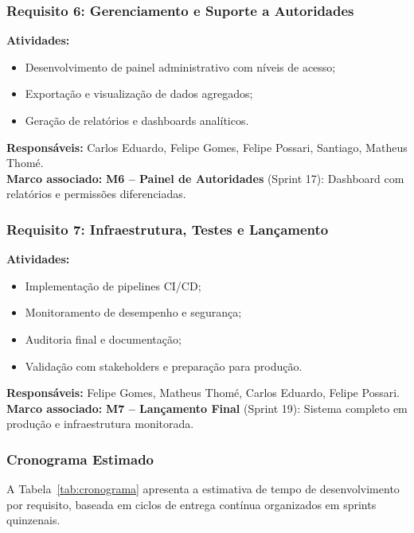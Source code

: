 \documentclass[a5paper, 12pt]{article}
\begin{document}
\subsubsection*{Requisito 6: Gerenciamento e Suporte a Autoridades}
\textbf{Atividades:}
\begin{itemize}
  \item Desenvolvimento de painel administrativo com níveis de acesso;
  \item Exportação e visualização de dados agregados;
  \item Geração de relatórios e dashboards analíticos.
\end{itemize}
\textbf{Responsáveis:} Carlos Eduardo, Felipe Gomes, Felipe Possari, Santiago, Matheus Thomé. \\
\textbf{Marco associado:} \textbf{M6 – Painel de Autoridades} (Sprint 17): Dashboard com relatórios e permissões diferenciadas.

\subsubsection*{Requisito 7: Infraestrutura, Testes e Lançamento}
\textbf{Atividades:}
\begin{itemize}
  \item Implementação de pipelines CI/CD;
  \item Monitoramento de desempenho e segurança;
  \item Auditoria final e documentação;
  \item Validação com stakeholders e preparação para produção.
\end{itemize}
\textbf{Responsáveis:} Felipe Gomes, Matheus Thomé, Carlos Eduardo, Felipe Possari. \\
\textbf{Marco associado:} \textbf{M7 – Lançamento Final} (Sprint 19): Sistema completo em produção e infraestrutura monitorada.

\subsubsection*{Cronograma Estimado}

A Tabela~\ref{tab:cronograma} apresenta a estimativa de tempo de desenvolvimento por requisito, baseada em ciclos de entrega contínua organizados em sprints quinzenais.
\end{document}
